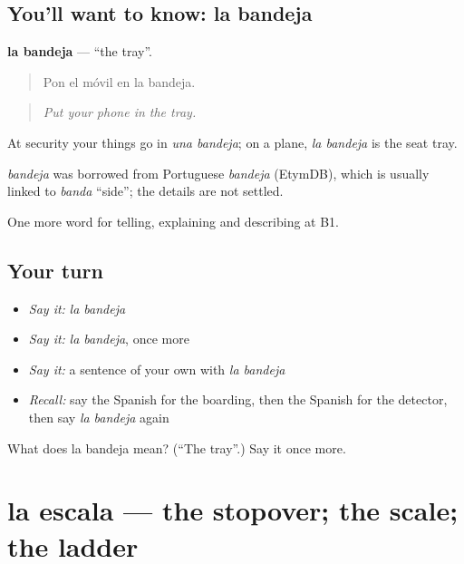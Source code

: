 \subsection*{You'll want to know: la bandeja}
\textbf{la bandeja} — \textquotedblleft{}the tray\textquotedblright{}.

\begin{quote}
Pon el móvil en la bandeja.
\end{quote}

\begin{quote}
\emph{Put your phone in the tray.}
\end{quote}

At security your things go in \emph{una bandeja}; on a plane, \emph{la bandeja} is the seat tray.

\begin{cousinweb}
\emph{bandeja} was borrowed from Portuguese \emph{bandeja} (EtymDB), which is usually linked to \emph{banda} \textquotedblleft{}side\textquotedblright{}; the details are not settled.
\end{cousinweb}

\begin{grammarlens}[title={What you've built}]
One more word for telling, explaining and describing at B1.
\end{grammarlens}

\subsection*{Your turn}
\begin{itemize}
\raggedright
  \item \emph{Say it:} \emph{la bandeja}
  \item \emph{Say it:} \emph{la bandeja}, once more
  \item \emph{Say it:} a sentence of your own with \emph{la bandeja}
  \item \emph{Recall:} say the Spanish for the boarding, then the Spanish for the detector, then say \emph{la bandeja} again
\end{itemize}

\begin{tcolorbox}[breakable,colback=teal!4,colframe=teal!35!black,title={Before you move on}]
What does la bandeja mean? (\textquotedblleft{}The tray\textquotedblright{}.) Say it once more.
\end{tcolorbox}
\section[la escala]{la escala — the stopover; the scale; the ladder}

